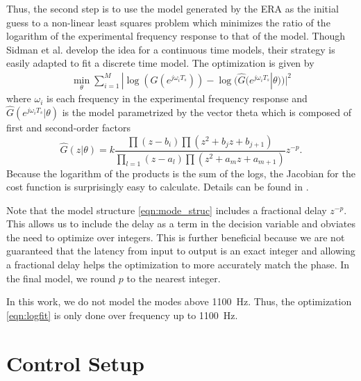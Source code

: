\documentclass[journal,twocolumn,twoside]{IEEEtran/IEEEtran}
\begin{document}
Thus, the second step is to use the model generated by the ERA as the initial guess to a non-linear least squares problem \cite{sidman_parametric_1991} which minimizes the ratio of the logarithm of the experimental frequency response to that of the model. Though Sidman et al. develop the idea for a continuous time models, their strategy is easily adapted to fit a discrete time model. The optimization is given by
\begin{align}
\min_{\theta} \sum_{i=1}^M| \log(G(e^{j\omega_iT_s})) - \log(\hat{G}(e^{j\omega_iT_s}|\theta))|^2
\label{eqn:logfit}
\end{align}
where $\omega_i$ is each frequency in the experimental frequency response and $\hat{G}(e^{j\omega_iT_s}|\theta)$ is the model parametrized by the vector theta which is composed of first and second-order factors
\begin{equation}
  \hat{G}(z|\theta) =k \frac{\prod (z-b_i) \prod(z^2 +b_jz + b_{j+1})}
  { \prod_{l=1}(z-a_l) \prod(z^2 +a_mz + a_{m+1})}z^{-p}. \label{eqn:mode_struc}
\end{equation}
Because the logarithm of the products is the sum of the logs, the Jacobian for the cost function is surprisingly easy to calculate. Details can be found in \cite{sidman_parametric_1991}.

Note that the model structure \eqref{eqn:mode_struc} includes a fractional delay $z^{-p}$. This allows us to include the delay as a term in the decision variable and obviates the need to optimize over integers. This is further beneficial because we are not guaranteed that the latency from input to output is an exact integer and allowing a fractional delay helps the optimization to more accurately match the phase. In the final model, we round $p$ to the nearest integer. 

In this work, we do not model the modes above 1100~Hz. Thus, the optimization \eqref{eqn:logfit} is only done over frequency up to 1100~Hz. 


\section{Control Setup}
\end{document}
